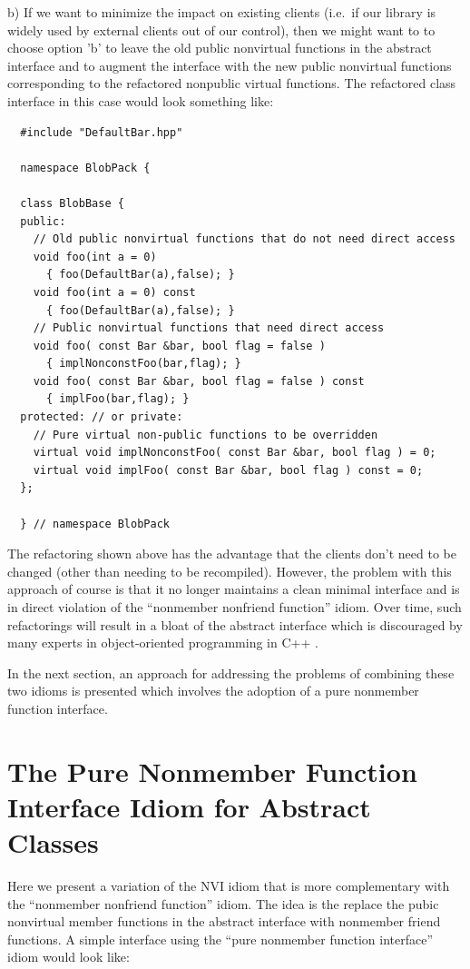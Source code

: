 \documentclass[pdf,ps2pdf,11pt]{SANDreport}
\begin{document}
b) If we want to minimize the impact on existing clients (i.e.\ if our library
is widely used by external clients out of our control), then we might want to
to choose option 'b' to leave the old public nonvirtual functions in the
abstract interface and to augment the interface with the new public nonvirtual
functions corresponding to the refactored nonpublic virtual functions.  The
refactored class interface in this case would look something like:

{\small\begin{verbatim}
  #include "DefaultBar.hpp"

  namespace BlobPack {

  class BlobBase {
  public:
    // Old public nonvirtual functions that do not need direct access
    void foo(int a = 0)
      { foo(DefaultBar(a),false); }
    void foo(int a = 0) const
      { foo(DefaultBar(a),false); }
    // Public nonvirtual functions that need direct access
    void foo( const Bar &bar, bool flag = false )
      { implNonconstFoo(bar,flag); }
    void foo( const Bar &bar, bool flag = false ) const
      { implFoo(bar,flag); }
  protected: // or private:
    // Pure virtual non-public functions to be overridden
    virtual void implNonconstFoo( const Bar &bar, bool flag ) = 0;
    virtual void implFoo( const Bar &bar, bool flag ) const = 0;
  };

  } // namespace BlobPack
\end{verbatim}}

The refactoring shown above has the advantage that the clients don't need to
be changed (other than needing to be recompiled).  However, the problem with
this approach of course is that it no longer maintains a clean minimal
interface and is in direct violation of the ``nonmember nonfriend function''
idiom.  Over time, such refactorings will result in a bloat of the abstract
interface which is discouraged by many experts in object-oriented programming
in C++ {}\cite[Item 33]{C++CodingStandards05}.

In the next section, an approach for addressing the problems of combining
these two idioms is presented which involves the adoption of a pure nonmember
function interface.

%
\section{The Pure Nonmember Function Interface Idiom for Abstract Classes}
%

Here we present a variation of the NVI idiom that is more complementary with
the ``nonmember nonfriend function'' idiom.  The idea is the replace the pubic
nonvirtual member functions in the abstract interface with nonmember friend
functions.  A simple interface using the ``pure nonmember function interface''
idiom would look like:
\end{document}
